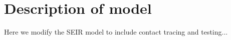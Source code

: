 \documentclass[notitlepage, superscriptaddress]{revtex4-2}
\begin{document}



\section{Description of model}
Here we modify the SEIR model to include contact tracing and testing...
\end{document}
